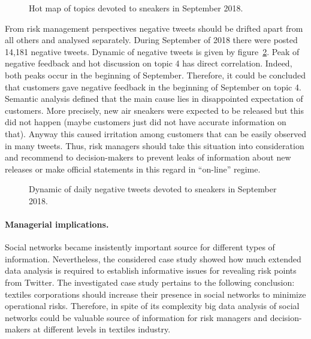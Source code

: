 \begin{figure}[ht]
	\caption{Hot map of topics devoted to sneakers in September 2018.}\label{fig:topicHotMap}
\end{figure}

From risk management perspectives negative tweets should be drifted apart from all others and analysed separately. During September of 2018 there were posted 14,181 negative tweets. Dynamic of negative tweets is given by figure~\cref{fig:dailyNegativeTweetDynamics}. Peak of negative feedback and hot discussion on topic 4 has direct correlation. Indeed, both peaks occur in the beginning of September. Therefore, it could be concluded that customers gave negative feedback in the beginning of September on topic 4. Semantic analysis defined that the main cause lies in disappointed expectation of customers. More precisely, new air sneakers were expected to be released but this did not happen (maybe customers just did not have accurate information on that). Anyway this caused irritation among customers that can be easily observed in many tweets. Thus, risk managers should take this situation into consideration and recommend to decision-makers to prevent leaks of information about new releases or make official statements in this regard in “on-line” regime.

\begin{figure}[ht]
	\caption{Dynamic of daily negative tweets devoted to sneakers in September 2018.}\label{fig:dailyNegativeTweetDynamics}
\end{figure}

\paragraph{Managerial implications.} Social networks became insistently important source for different types of information. Nevertheless, the considered case study showed how much extended data analysis is required to establish informative issues for revealing risk points from Twitter. The investigated case study pertains to the following conclusion: textiles corporations should increase their presence in social networks to minimize operational risks. Therefore, in spite of its complexity big data analysis of social networks could be valuable source of information for risk managers and decision-makers at different levels in textiles industry.

